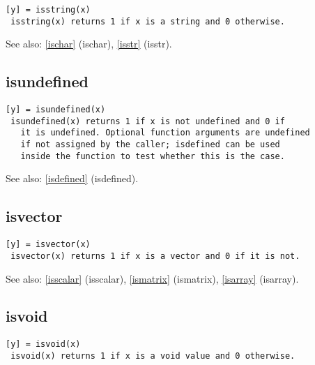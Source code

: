 \documentclass[a4paper]{article}
\begin{document}
\begin{tscreen}
\begin{verbatim}
[y] = isstring(x)
 isstring(x) returns 1 if x is a string and 0 otherwise.
\end{verbatim}

See also: \ref{ischar} {(ischar)}, \ref{isstr} {(isstr)}.
\end{tscreen}





\subsection{isundefined\label{isundefined}}

\begin{tscreen}
\begin{verbatim}
[y] = isundefined(x)
 isundefined(x) returns 1 if x is not undefined and 0 if
   it is undefined. Optional function arguments are undefined
   if not assigned by the caller; isdefined can be used
   inside the function to test whether this is the case.
\end{verbatim}

See also: \ref{isdefined} {(isdefined)}.
\end{tscreen}





\subsection{isvector\label{isvector}}

\begin{tscreen}
\begin{verbatim}
[y] = isvector(x)
 isvector(x) returns 1 if x is a vector and 0 if it is not.
\end{verbatim}

See also: \ref{isscalar} {(isscalar)}, \ref{ismatrix} {(ismatrix)}, \ref{isarray} {(isarray)}.
\end{tscreen}





\subsection{isvoid\label{isvoid}}

\begin{tscreen}
\begin{verbatim}
[y] = isvoid(x)
 isvoid(x) returns 1 if x is a void value and 0 otherwise. 
\end{verbatim}
\end{tscreen}
\end{document}
